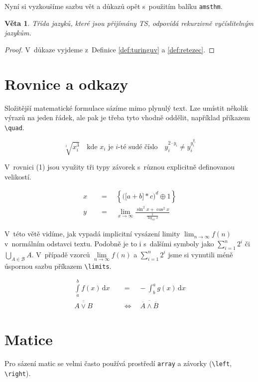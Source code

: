 \documentclass[11pt,twocolumn,a4paper]{article}
\theoremstyle{definition}
\theoremstyle{plain}
\newtheorem{sentence}{Věta}
\begin{document}
Nyní si vyzkoušíme sazbu vět a důkazů opět s~použitím balíku \texttt{amsthm}.

\begin{sentence} Třída jazyků, které jsou přijímány TS, odpovídá \emph{rekurzivně vyčíslitelným jazykům.}\end{sentence}

\begin{proof} V~důkaze vyjdeme z~Definice \ref{def:turinguv} a \ref{def:retezec}. \end{proof}

\section{Rovnice a odkazy}
Složitější matematické formulace sázíme mimo plynulý text. Lze umístit několik výrazů na jeden řádek, ale pak je třeba tyto vhodně oddělit, například příkazem \verb|\quad|.\par

$$\sqrt[i]{x_i^3}\quad \text{kde } x_i \text{ je }i\text{-té sudé číslo}\quad y_i^{2\cdot y_i} \neq y_i^{y_i^{y_i}}$$

V~rovnici (1) jsou využity tři typy závorek s~různou explicitně definovanou velikostí. \par

\begin{align} \label{eq:1}
x \quad &= \quad \left\{ \Big( \big[ a+b \big] *c \Big)^d \oplus 1 \right\}\\
y \quad &= \quad \lim_{x \to\infty} \frac{\sin^2 x + \cos^2 x}{\frac{1}{\log_{10}x}} \nonumber
\end{align}

V~této větě vidíme, jak vypadá implicitní vysázení limity $\lim_{n \to\infty} f(n)$ v~normálním odstavci textu. Podobně je to i s~dalšími symboly jako $\sum_{i=1}^n 2^i$ či $\bigcup_{A \in \mathcal{B}}A$. V~případě vzorců $\lim\limits_{n \to\infty} f(n)$ a $\sum\limits_{i=1}^n 2^i$ jsme si vynutili méně úspornou sazbu příkazem \verb|\limits|.\par

\begin{align}
\int\limits_a^b f(x)\,\mathrm{d}x \quad &= \quad -\int_b^a g(x)\,\mathrm{d}x \\
\overline{\overline{A \lor B}} \quad &\Leftrightarrow \quad \overline{\overline{A} \land \overline{B}}
\end{align}

\section{Matice}
Pro sázení matic se velmi často používá prostředí \verb|array| a závorky (\verb|\left|, \verb|\right|).
\end{document}

